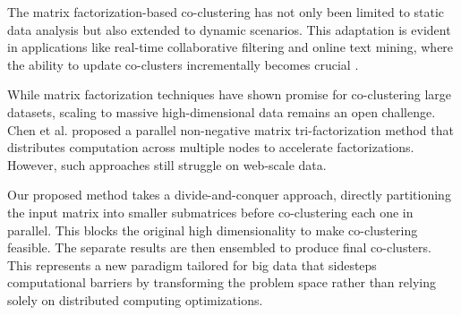 The matrix factorization-based co-clustering has not only been limited to static data analysis but also extended to dynamic scenarios. This adaptation is evident in applications like real-time collaborative filtering and online text mining, where the ability to update co-clusters incrementally becomes crucial \cite{daruru2009PervasiveParallelismData}.




While matrix factorization techniques have shown promise for co-clustering large datasets, scaling to massive high-dimensional data remains an open challenge. Chen et al. \cite{chen2023ParallelNonNegativeMatrix} proposed a parallel non-negative matrix tri-factorization method that distributes computation across multiple nodes to accelerate factorizations. However, such approaches still struggle on web-scale data.

Our proposed method takes a divide-and-conquer approach, directly partitioning the input matrix into smaller submatrices before co-clustering each one in parallel. This blocks the original high dimensionality to make co-clustering feasible. The separate results are then ensembled to produce final co-clusters. This represents a new paradigm tailored for big data that sidesteps computational barriers by transforming the problem space rather than relying solely on distributed computing optimizations.